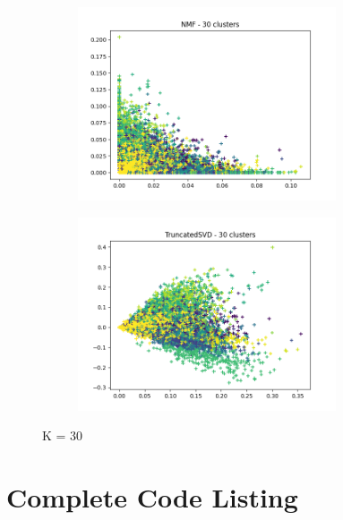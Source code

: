 \documentclass[11pt]{article}
\begin{document}
\begin{appendices}
\begin{figure}[H]
\centering
\begin{subfigure}{\textwidth}
  \centering
  \includegraphics[width=3in]{images/nmf_30.png}
  \label{fig:nmf13}
\end{subfigure}%
\begin{subfigure}{\textwidth}
  \centering
  \includegraphics[width=3in]{images/svd_30.png}
  \label{fig:svd30}
\end{subfigure}
\caption{K = 30}
\label{fig:k30}
\end{figure}


\newpage
\section{Complete Code Listing} \label{codelist}


\end{appendices}
  
\end{document}
